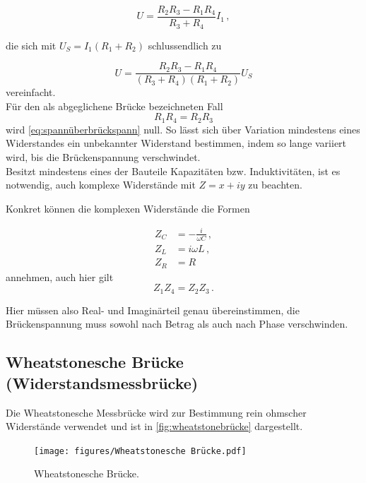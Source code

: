 \begin{equation}
    U = \frac{R_2 R_3 - R_1 R_4}{R_3 + R_4} I_1 \,,
    \label{eq:spannungglei4}
\end{equation}

die sich mit $U_S = I_1 (R_1 + R_2)$ schlussendlich zu 

\begin{equation}
    U = \frac{R_2 R_3 - R_1 R_4}{(R_3 + R_4)(R_1 + R_2)} U_S
    \label{eq:spannüberbrückspann}
\end{equation} vereinfacht. \\

Für den als abgeglichene Brücke bezeichneten Fall 
\begin{equation}
    R_1 R_4 = R_2 R_3
    \label{eq:abgleichbed}
\end{equation} wird \eqref{eq:spannüberbrückspann} null. 
So lässt sich über Variation mindestens eines Widerstandes ein unbekannter Widerstand bestimmen, indem so lange variiert wird, bis die Brückenspannung verschwindet.\\

Besitzt mindestens eines der Bauteile Kapazitäten bzw. Induktivitäten, ist es notwendig, auch komplexe Widerstände mit $Z = x + iy$ zu beachten.

Konkret können die komplexen Widerstände die Formen

\begin{align}
    Z_C & = -\frac{i}{ω C} \label{eq:rescap}\,, \\
    Z_L & = i ω L \label{eq:resind} \,, \\
    Z_R & = R \label{eq:resohm} 
\end{align} 
annehmen, auch hier gilt
\begin{equation*}
    Z_1 Z_4 = Z_2 Z_3 \,.
\end{equation*} 

Hier müssen also Real- und Imaginärteil genau übereinstimmen, die Brückenspannung muss sowohl nach Betrag als auch nach Phase verschwinden.


\subsection{Wheatstonesche Brücke (Widerstandsmessbrücke)}
\label{subsec:wheatstone}

Die Wheatstonesche Messbrücke wird zur Bestimmung rein ohmscher Widerstände verwendet und ist in \autoref{fig:wheatstonebrücke} dargestellt.

\begin{figure}[H]
    \centering
    \texttt{[image: figures/Wheatstonesche Brücke.pdf]}
    \caption{Wheatstonesche Brücke\cite{ap07}.}
    \label{fig:wheatstonebrücke}
\end{figure}

